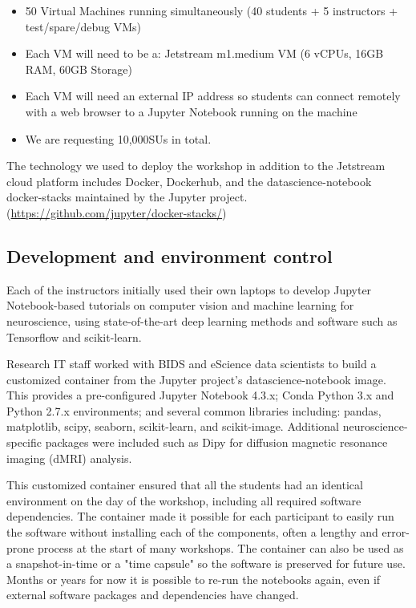 \begin{itemize}
\item 50 Virtual Machines running simultaneously (40 students + 5 instructors +
test/spare/debug VMs)
\item Each VM will need to be a: Jetstream m1.medium VM (6 vCPUs, 16GB RAM, 60GB
  Storage)
\item Each VM will need an external IP address so students can connect remotely
  with a web browser to a Jupyter Notebook running on the machine
\item We are requesting 10,000SUs in total.
\end{itemize}


The technology we used to deploy the workshop in addition to the Jetstream cloud
platform includes Docker, Dockerhub, and the datascience-notebook docker-stacks
maintained by the Jupyter project. (\url{https://github.com/jupyter/docker-stacks/})

\subsection{Development and environment control}

Each of the instructors initially used their own laptops to develop Jupyter
Notebook-based tutorials on computer vision and machine learning for
neuroscience, using state-of-the-art deep learning methods and software such as
Tensorflow and scikit-learn.

Research IT staff worked with BIDS and eScience data scientists to build a
customized container from the Jupyter project's datascience-notebook image. This
provides a pre-configured Jupyter Notebook 4.3.x; Conda Python 3.x and Python
2.7.x environments; and several common libraries including: pandas, matplotlib,
scipy, seaborn, scikit-learn, and scikit-image. Additional neuroscience-specific
packages were included such as Dipy for diffusion magnetic resonance imaging
(dMRI) analysis.

This customized container ensured that all the students had an identical
environment on the day of the workshop, including all required software
dependencies. The container made it possible for each participant to easily run
the software without installing each of the components, often a lengthy and
error-prone process at the start of many workshops. The container can also be
used as a snapshot-in-time or a "time capsule" so the software is preserved for
future use. Months or years for now it is possible to re-run the notebooks
again, even if external software packages and dependencies have changed.

